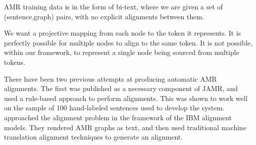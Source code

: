 
AMR training data is in the form of bi-text, where we are given a set of
  (sentence,graph) pairs, with no explicit alignments between them.

We want a projective mapping from each node to the token it represents. It is perfectly possible for multiple nodes to align to the same token. It is not possible, within our framework, to represent a single node being sourced from multiple tokens.




There have been two previous attempts at producing automatic AMR alignments. 
The first was published as a necessary component of JAMR, 
  and used a rule-based approach to perform alignments.
This was shown to work well on the sample of 100 hand-labeled sentences used to 
  develop the system.
 approached the alignment problem in 
  the framework of the IBM alignment models.
They rendered AMR graphs as text, and then used traditional machine translation 
  alignment techniques to generate an alignment.

